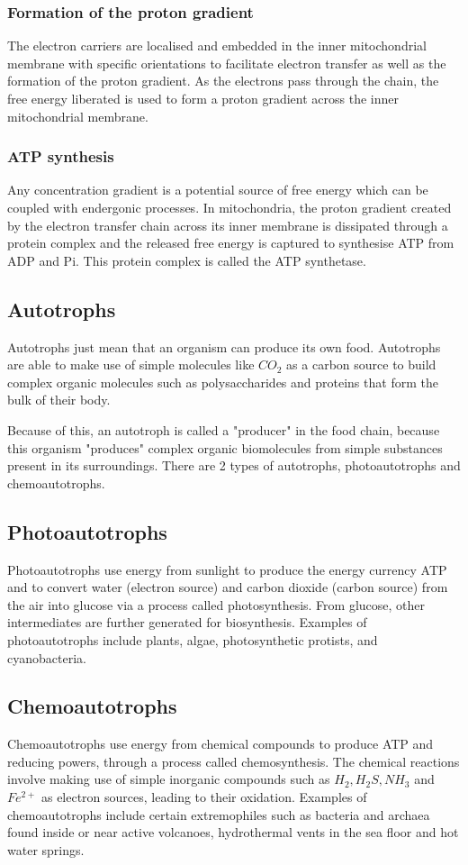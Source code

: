 \documentclass[11pt]{article}
\begin{document}
\subsubsection{Formation of the proton gradient}
\label{sec:orga42651e}
The electron carriers are localised and embedded in the inner mitochondrial membrane with specific orientations to facilitate electron transfer as well as the formation of the proton gradient. As the electrons pass through the chain, the free energy liberated is used to form a proton gradient across the inner mitochondrial membrane.

\newpage
\subsubsection{ATP synthesis}
\label{sec:orgdd42693}
Any concentration gradient is a potential source of free energy which can be coupled with endergonic processes. In mitochondria, the proton gradient created by the electron transfer chain across its inner membrane is dissipated through a protein complex and the released free energy is captured to synthesise ATP from ADP and Pi. This protein complex is called the ATP synthetase.
\subsection{Autotrophs}
\label{sec:org0031a9d}
Autotrophs just mean that an organism can produce its own food. Autotrophs are able to make use of simple molecules like \(CO_2\) as a carbon source to build complex organic molecules such as polysaccharides and proteins that form the bulk of their body.


Because of this, an autotroph is called a "producer" in the food chain, because this organism "produces" complex organic biomolecules from simple substances present in its surroundings. There are 2 types of autotrophs, photoautotrophs and chemoautotrophs.
\subsection{Photoautotrophs}
\label{sec:orge096a60}
Photoautotrophs use energy from sunlight to produce the energy currency ATP and to convert water (electron source) and carbon dioxide (carbon source) from the air into glucose via a process called photosynthesis. From glucose, other intermediates are further generated for biosynthesis. Examples of photoautotrophs include plants, algae, photosynthetic protists, and cyanobacteria.
\subsection{Chemoautotrophs}
\label{sec:orgcab8b0d}
Chemoautotrophs use energy from chemical compounds to produce ATP and reducing powers, through a process called chemosynthesis. The chemical reactions involve making use of simple inorganic compounds such as \(H_2, H_2 S, NH_3\) and \(Fe^{2+}\) as electron sources, leading to their oxidation. Examples of chemoautotrophs include certain extremophiles such as bacteria and archaea found inside or near active volcanoes, hydrothermal vents in the sea floor and hot water springs.
\end{document}
